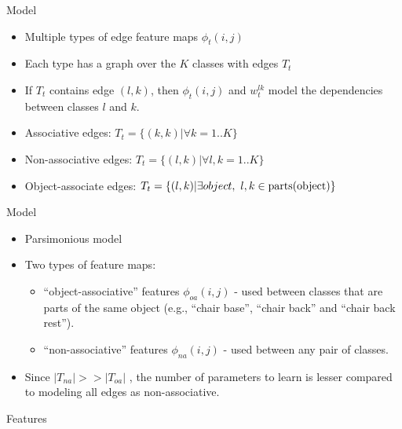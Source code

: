 \documentclass{beamer}
\newcommand{\fe}[3]{{\phi_{#1}(#2,#3)}}%
\newcommand{\we}[3]{{w_{#1}^{#2#3}}}   %
\begin{document}
\begin{frame}{Model}

\begin{itemize}

\item Multiple types of edge feature maps $\fe{t}{i}{j}$
\item Each type has a graph over the $K$ classes with edges  $T_t$
\item If $T_t$ contains edge $(l,k)$, then $\fe{t}{i}{j}$ and $\we{t}{l}{k}$  model the dependencies between classes $l$ and $k$.
\item Associative edges:  ${T_t}=\{(k,k)| \forall k=1..K\}$
\item Non-associative edges: $T_t=\{(l,k)| \forall l,k=1..K\}$
\item Object-associate edges: $T_t=\{(l,k) | \exists object , ~ l,k\in {\rm parts}({\rm object})\}$

\end{itemize}
\end{frame}

\begin{frame}{Model}
\begin{itemize}
\item Parsimonious model

\item Two types of feature maps: 
\begin{itemize}
\item ``object-associative'' features $\fe{oa}{i}{j}$ - used between classes that are parts of the same object (e.g., ``chair base'', ``chair back'' and ``chair back rest''). 
\item ``non-associative'' features $\fe{na}{i}{j}$ -  used between any pair of classes.
\end{itemize}
\item Since $|T_{na}| >> |T_{oa}|$ , the number of parameters to learn is lesser compared to modeling all edges as non-associative.
\end{itemize}
\end{frame}


\begin{frame}{Features}

\end{frame}
\end{document}
